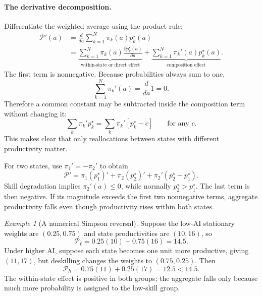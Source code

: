 \documentclass[11pt]{article}
\theoremstyle{tutorial}
\theoremstyle{remark}
\newtheorem{example}[theorem]{Example}
\newcommand{\1}{\mathbb{I}}
\newcommand{\calP}{\mathcal{P}}
\begin{document}
\paragraph{The derivative decomposition.}
Differentiate the weighted average using the product rule:
\begin{align}
\calP'(a)
&=\frac{d}{da}\sum_{k=1}^N\pi_k(a)p_k^\star(a)\nonumber\\
&=\underbrace{\sum_{k=1}^N\pi_k(a)
\frac{\partial p_k^\star(a)}{\partial a}}_{\text{within-state or direct effect}}
+\underbrace{\sum_{k=1}^N\pi_k'(a)p_k^\star(a)}_{\text{composition effect}}.
\label{eq:simpson-decomposition}
\end{align}
The first term is nonnegative.  Because probabilities always sum to one,
\[
  \sum_{k=1}^N\pi_k'(a)=\frac{d}{da}1=0.
\]
Therefore a common constant may be subtracted inside the composition term without changing it:
\[
  \sum_k\pi_k'p_k^\star
  =\sum_k\pi_k'[p_k^\star-c]
  \qquad\text{for any }c.
\]
This makes clear that only reallocations between states with different productivity matter.

For two states, use $\pi_1'=-\pi_2'$ to obtain
\begin{equation}
\calP'
=\pi_1(p_1^\star)'+\pi_2(p_2^\star)'
+\pi_2'(p_2^\star-p_1^\star).
\label{eq:two-state-simpson}
\end{equation}
Skill degradation implies $\pi_2'(a)\le0$, while normally $p_2^\star>p_1^\star$.  The last term is then
negative.  If its magnitude exceeds the first two nonnegative terms, aggregate productivity falls even
though productivity rises within both states.

\begin{example}[A numerical Simpson reversal]
Suppose the low-AI stationary weights are $(0.25,0.75)$ and state productivities are $(10,16)$, so
\[
  \calP_{\ell}=0.25(10)+0.75(16)=14.5.
\]
Under higher AI, suppose each state becomes one unit more productive, giving $(11,17)$, but deskilling
changes the weights to $(0.75,0.25)$.  Then
\[
  \calP_h=0.75(11)+0.25(17)=12.5<14.5.
\]
The within-state effect is positive in both groups; the aggregate falls only because much more probability
is assigned to the low-skill group.
\end{example}
\end{document}
